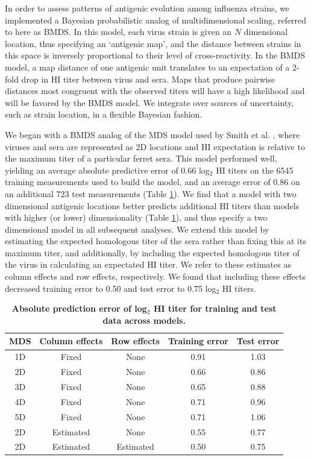 \documentclass[11pt,oneside,letterpaper]{article}
\begin{document}
In order to assess patterns of antigenic evolution among influenza strains, we implemented a Bayesian probabilistic analog of multidimensional scaling, referred to here as BMDS.
In this model, each virus strain is given an $N$ dimensional location, thus specifying an `antigenic map', and the distance between strains in this space is inversely proportional to their level of cross-reactivity.
In the BMDS model, a map distance of one antigenic unit translates to an expectation of a 2-fold drop in HI titer between virus and sera.
Maps that produce pairwise distances most congruent with the observed titers will have a high likelihood and will be favored by the BMDS model.
We integrate over sources of uncertainty, such as strain location, in a flexible Bayesian fashion.

We began with a BMDS analog of the MDS model used by Smith et al. \cite{Smith04}, where viruses and sera are represented as 2D locations and HI expectation is relative to the maximum titer of a particular ferret sera.
This model performed well, yielding an average absolute predictive error of 0.66 log$_2$ HI titers on the 6545 training measurements used to build the model, and an average error of 0.86 on an additional 723 test measurements (Table \ref{errortable}).
We find that a model with two dimensional antigenic locations better predicts additional HI titers than models with higher (or lower) dimensionality (Table \ref{errortable}), and thus specify a two dimensional model in all subsequent analyses.
We extend this model by estimating the expected homologous titer of the sera rather than fixing this at its maximum titer, and additionally, by including the expected homologous titer of the virus in calculating an expectated HI titer.
We refer to these estimates as column effects and row effects, respectively.
We found that including these effects decreased training error to 0.50 and test error to 0.75 log$_2$ HI titers.

\begin{table}[tb]
	\centering
	\caption{\textbf{Absolute prediction error of log$_2$ HI titer for training and test data across models.}}
	\label{errortable}
	\begin{tabular}{ c c c c c } 
	\hline
	MDS 	& 	Column effects 	&	Row effects	& 	Training error	& 	Test error	\\
	\hline	
	1D 		&	Fixed 			&	None		& 	0.91			&	1.03		\\	
	2D 		&	Fixed 			&	None		& 	0.66			&	0.86		\\
	3D 		&	Fixed 			&	None		& 	0.65			&	0.88		\\
	4D 		&	Fixed 			&	None		& 	0.71			&	0.96		\\
	5D 		&	Fixed 			&	None		& 	0.71			&	1.06		\\	
	2D 		&	Estimated 		&	None		& 	0.55			&	0.77		\\	
	2D 		&	Estimated 		&	Estimated	& 	0.50			&	0.75		\\		
	\hline
	\end{tabular}
\end{table}
\end{document}
